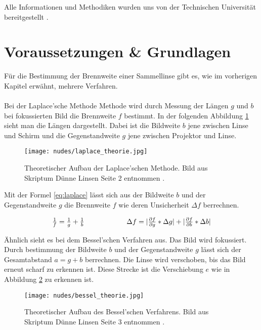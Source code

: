 \documentclass[12pt,a4paper,twoside]{article}
\begin{document}
\noindent
Alle Informationen und Methodiken wurden uns von der Technischen Universität bereitgestellt \cite{teachcenter2}. 

\section{Voraussetzungen \& Grundlagen} %
Für die Bestimmung der Brennweite einer Sammellinse gibt es, wie im vorherigen Kapitel erwähnt, mehrere Verfahren. 
\\
\\
Bei der Laplace'sche Methode Methode wird durch Messung der Längen $g$ und $b$ bei fokussierten Bild die Brennweite $f$ bestimmt. 
In der folgenden Abbildung \ref{fig:laplace_theorie} sieht man die Längen dargestellt. Dabei ist die Bildweite $b$ jene zwischen Linse und Schirm und die Gegenstandweite $g$ jene zwischen Projektor und Linse. 

\begin{figure}[H]
    \centering
    \texttt{[image: nudes/laplace\_theorie.jpg]}
    \caption{Theoretischer Aufbau der Laplace'schen Methode. Bild aus Skriptum Dünne Linsen Seite 2 entnommen \cite{teachcenter2}. }
    \label{fig:laplace_theorie}
\end{figure}

\noindent
Mit der Formel \ref{eq:laplace} lässt sich aus der Bildweite $b$ und der Gegenstandweite $g$ die Brennweite $f$ wie deren Unsicherheit $\Delta f$ berrechnen. 

\begin{equation}
    \label{eq:laplace}
    \centerline{$\frac{1}{f}=\frac{1}{g} + \frac{1}{b}$ \\ $\Delta f = \vert \frac{\partial f}{\partial g} * \Delta g \vert + \vert \frac{\partial f}{\partial b} * \Delta b \vert$}
\end{equation}

\noindent
Ähnlich sieht es bei dem Bessel'schen Verfahren aus. Das Bild wird fokussiert. Durch bestimmung der Bildweite $b$ und der Gegenstandweite $g$ lässt sich der Gesamtabstand $a = g+b$ berrechnen. 
Die Linse wird verschoben, bis das Bild erneut scharf zu erkennen ist. Diese Strecke ist die Verschiebung $e$ wie in Abbildung \ref{fig:bessel_theorie} zu erkennen ist.  

\begin{figure}[H]
    \centering
    \texttt{[image: nudes/bessel\_theorie.jpg]}
    \caption{Theoretischer Aufbau des Bessel'schen Verfahrens. Bild aus Skriptum Dünne Linsen Seite 3 entnommen \cite{teachcenter2}. }
    \label{fig:bessel_theorie}
\end{figure}
\end{document}
